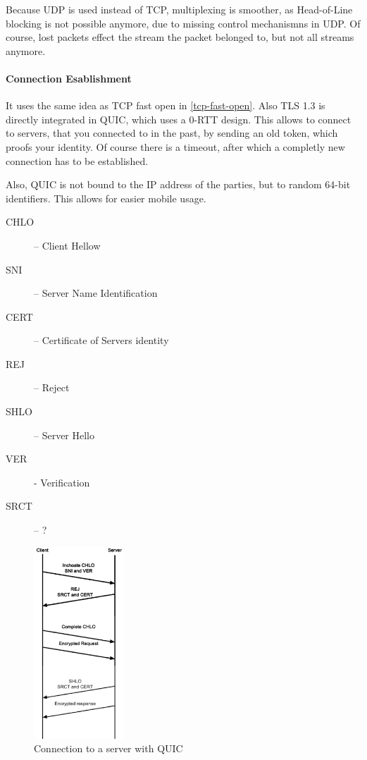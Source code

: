 \documentclass[english]{panikzettel}
\begin{document}
	Because UDP is used instead of TCP, multiplexing is smoother, as Head-of-Line blocking is not possible anymore, due to missing control mechanismns in UDP.
	Of course, lost packets effect the stream the packet belonged to, but not all streams anymore.

	\paragraph{Connection Esablishment}
	\label{pgf-connection-esablishement}
	
	It uses the same idea as TCP fast open in \cref{tcp-fast-open}.
	Also TLS 1.3 is directly integrated in QUIC, which uses a 0-RTT design. 
	This allows to connect to servers, that you connected to in the past, by sending an old token, which proofs your identity.
	Of course there is a timeout, after which a completly new connection has to be established.

	Also, QUIC is not bound to the IP address of the parties, but to random 64-bit identifiers. 
	This allows for easier mobile usage.

	\begin{halfboxl}
		\begin{center}
			\begin{description}
				\item[CHLO] – Client Hellow
				\item[SNI] – Server Name Identification
				\item[CERT] – Certificate of Servers identity
				\item[REJ] – Reject
				\item[SHLO] – Server Hello
				\item[VER] - Verification
				\item[SRCT] – ?
			\end{description}
		\end{center}
	\end{halfboxl}%
	\begin{halfboxr}
		\vspace{-\baselineskip}
		\begin{figure}[H]
			\centering
			\includegraphics[width=0.3\textwidth]{img/2-quic-connecting.png}
			\caption{Connection to a server with QUIC}
			\label{img-2-quic-connecting}
		\end{figure}
	\end{halfboxr}
\end{document}
